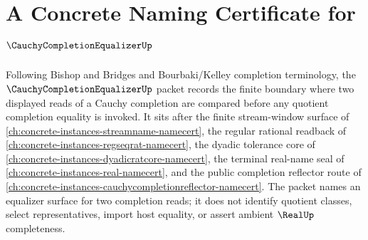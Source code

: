 \chapter{A Concrete Naming Certificate for $\CauchyCompletionEqualizerUp$}
\label{ch:concrete-instances-cauchy-completion-equalizer-namecert}

Following Bishop and Bridges and Bourbaki/Kelley completion terminology, the $\CauchyCompletionEqualizerUp$ packet records the finite boundary where two displayed reads of a Cauchy completion are compared before any quotient completion equality is invoked. It sits after the finite stream-window surface of \autoref{ch:concrete-instances-streamname-namecert}, the regular rational readback of \autoref{ch:concrete-instances-regseqrat-namecert}, the dyadic tolerance core of \autoref{ch:concrete-instances-dyadicratcore-namecert}, the terminal real-name seal of \autoref{ch:concrete-instances-real-namecert}, and the public completion reflector route of \autoref{ch:concrete-instances-cauchycompletionreflector-namecert}. The packet names an equalizer surface for two completion reads; it does not identify quotient classes, select representatives, import host equality, or assert ambient $\RealUp$ completeness.

